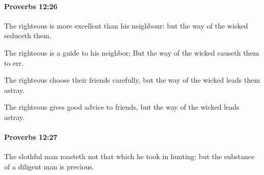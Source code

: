 		\paragraph{Proverbs 12:26} %
			\label{PROVERBS-12-26}

			The righteous is more excellent than his neighbour: but the way of the wicked seduceth them.

			\begin{versebox}
					\item[BHS] 
					\item[ASV] The righteous is a guide to his neighbor; But the way of the wicked causeth them to err.
					\item[NIV] The righteous choose their friends carefully, but the way of the wicked leads them astray.
					\item[NRSV] The righteous gives good advice to friends, but the way of the wicked leads astray.
			\end{versebox}

		\paragraph{Proverbs 12:27} %
			\label{PROVERBS-12-27}

			The slothful man roasteth not that which he took in hunting: but the substance of a diligent man is precious.

